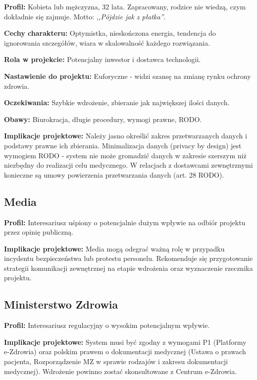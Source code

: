 \textbf{Profil:} Kobieta lub mężczyzna, 32 lata. Zapracowany, rodzice nie wiedzą, czym dokładnie się zajmuje. Motto: \emph{,,Pójdzie jak z płatka''}.

\textbf{Cechy charakteru:} Optymistka, nieskończona energia, tendencja do ignorowania szczegółów, wiara w skalowalność każdego rozwiązania.

\textbf{Rola w projekcie:} Potencjalny inwestor i dostawca technologii.

\textbf{Nastawienie do projektu:} Euforyczne - widzi szansę na zmianę rynku ochrony zdrowia.

\textbf{Oczekiwania:} Szybkie wdrożenie, zbieranie jak największej ilości danych.

\textbf{Obawy:} Biurokracja, długie procedury, wymogi prawne, RODO.

\textbf{Implikacje projektowe:} Należy jasno określić zakres przetwarzanych danych i podstawy prawne ich zbierania. Minimalizacja danych (privacy by design) jest wymogiem RODO - system nie może gromadzić danych w zakresie szerszym niż niezbędny do realizacji celu medycznego. W relacjach z dostawcami zewnętrznymi konieczne są umowy powierzenia przetwarzania danych (art. 28 RODO).

\subsection{Media}

\textbf{Profil:} Interesariusz uśpiony o potencjalnie dużym wpływie na odbiór projektu przez opinię publiczną.

\textbf{Implikacje projektowe:} Media mogą odegrać ważną rolę w przypadku incydentu bezpieczeństwa lub protestu personelu. Rekomenduje się przygotowanie strategii komunikacji zewnętrznej na etapie wdrożenia oraz wyznaczenie rzecznika projektu.

\subsection{Ministerstwo Zdrowia}

\textbf{Profil:} Interesariusz regulacyjny o wysokim potencjalnym wpływie.

\textbf{Implikacje projektowe:} System musi być zgodny z wymogami P1 (Platformy e-Zdrowia) oraz polskim prawem o dokumentacji medycznej (Ustawa o prawach pacjenta, Rozporządzenie MZ w sprawie rodzajów i zakresu dokumentacji medycznej). Wdrożenie powinno zostać skonsultowane z Centrum e-Zdrowia.

